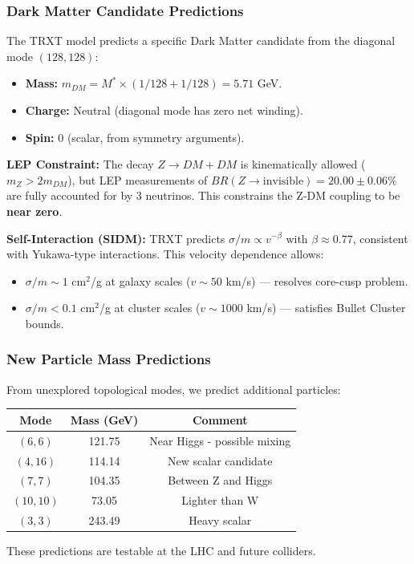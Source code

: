 \subsubsection{Dark Matter Candidate Predictions}
The TRXT model predicts a specific Dark Matter candidate from the diagonal mode $(128, 128)$:
\begin{itemize}
    \item \textbf{Mass:} $m_{DM} = M^* \times (1/128 + 1/128) = 5.71$ GeV.
    \item \textbf{Charge:} Neutral (diagonal mode has zero net winding).
    \item \textbf{Spin:} 0 (scalar, from symmetry arguments).
\end{itemize}

\textbf{LEP Constraint:} The decay $Z \to DM + DM$ is kinematically allowed ($m_Z > 2 m_{DM}$), but LEP measurements of $BR(Z \to \text{invisible}) = 20.00 \pm 0.06\%$ are fully accounted for by 3 neutrinos. This constrains the Z-DM coupling to be \textbf{near zero}.

\textbf{Self-Interaction (SIDM):} TRXT predicts $\sigma/m \propto v^{-\beta}$ with $\beta \approx 0.77$, consistent with Yukawa-type interactions. This velocity dependence allows:
\begin{itemize}
    \item $\sigma/m \sim 1$ cm$^2$/g at galaxy scales ($v \sim 50$ km/s) — resolves core-cusp problem.
    \item $\sigma/m < 0.1$ cm$^2$/g at cluster scales ($v \sim 1000$ km/s) — satisfies Bullet Cluster bounds.
\end{itemize}

\subsubsection{New Particle Mass Predictions}
From unexplored topological modes, we predict additional particles:
\begin{center}
\begin{tabular}{ccc}
\toprule
\textbf{Mode} & \textbf{Mass (GeV)} & \textbf{Comment} \\
\midrule
$(6, 6)$ & 121.75 & Near Higgs - possible mixing \\
$(4, 16)$ & 114.14 & New scalar candidate \\
$(7, 7)$ & 104.35 & Between Z and Higgs \\
$(10, 10)$ & 73.05 & Lighter than W \\
$(3, 3)$ & 243.49 & Heavy scalar \\
\bottomrule
\end{tabular}
\end{center}
These predictions are testable at the LHC and future colliders.

